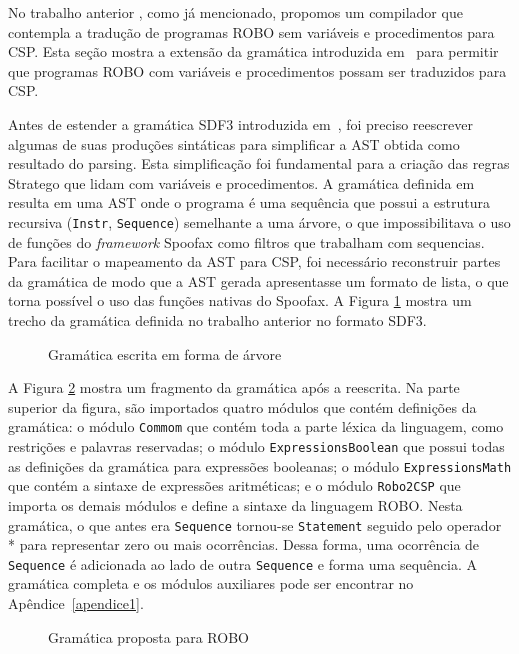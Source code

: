 No trabalho anterior \cite{nogueira}, como já mencionado, propomos um compilador que contempla a tradução de programas ROBO sem variáveis e procedimentos para CSP. Esta seção mostra a extensão da gramática introduzida em~\cite{nogueira} para permitir que programas ROBO com variáveis e procedimentos possam ser traduzidos para CSP. 

Antes de estender a gramática SDF3 introduzida em~\cite{nogueira}, foi preciso reescrever algumas de suas produções sintáticas para simplificar a AST obtida como resultado do parsing. Esta simplificação foi fundamental para a criação das regras Stratego que lidam com variáveis e procedimentos. A gramática definida em~\cite{nogueira} resulta em uma AST onde o programa é uma sequência que possui a estrutura recursiva (\texttt{Instr}, \texttt{Sequence}) semelhante a uma árvore, o que impossibilitava o uso de funções do \textit{framework} Spoofax como filtros que trabalham com sequencias. Para facilitar o mapeamento da AST para CSP, foi necessário reconstruir partes da gramática de modo que a AST gerada apresentasse um formato de lista, o que torna possível o uso das funções nativas do Spoofax. A Figura \ref{fig:gramatica_antes} mostra um trecho da gramática definida no trabalho anterior no formato SDF3. 

\begin{figure}[h]
\caption{Gramática escrita em forma de árvore}

\label{fig:gramatica_antes}
\end{figure}

A Figura \ref{fig:gramatica} mostra um fragmento da gramática após a reescrita. Na parte superior da figura, são importados quatro módulos que contém definições da gramática: o módulo \texttt{Commom} que contém toda a parte léxica da linguagem, como restrições e palavras reservadas; o módulo \texttt{ExpressionsBoolean} que possui todas as definições da gramática para expressões booleanas; o módulo \texttt{ExpressionsMath} que contém a sintaxe de expressões aritméticas; e o módulo \texttt{Robo2CSP} que importa os demais módulos e define a sintaxe da linguagem ROBO. Nesta gramática, o que antes era \texttt{Sequence} tornou-se \texttt{Statement} seguido pelo operador * para representar zero ou mais ocorrências. Dessa forma, uma ocorrência de \texttt{Sequence} é adicionada ao lado de outra \texttt{Sequence} e forma uma sequência. A gramática completa e os módulos auxiliares pode ser encontrar no Apêndice~\ref{apendice1}.

\begin{figure}[h]
\caption{Gramática proposta para ROBO}

\label{fig:gramatica}
\end{figure}


